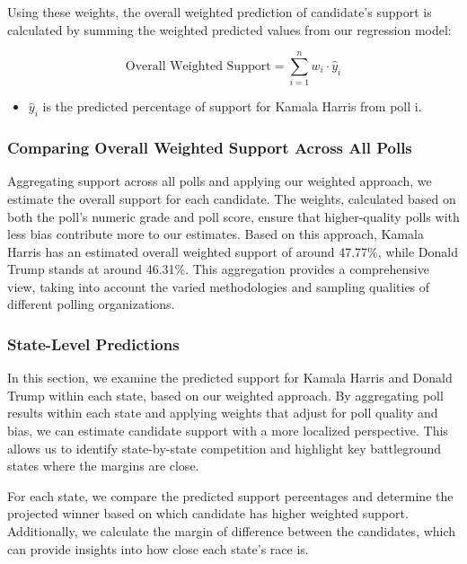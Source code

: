 \documentclass[
  letterpaper,
  DIV=11,
  numbers=noendperiod]{scrartcl}
\providecommand{\tightlist}{%
  \setlength{\itemsep}{0pt}\setlength{\parskip}{0pt}}\usepackage{longtable,booktabs,array}
\begin{document}
Using these weights, the overall weighted prediction of candidate's
support is calculated by summing the weighted predicted values from our
regression model:

\[
\text{Overall Weighted Support} = \sum_{i=1}^{n} w_i \cdot \hat{y}_i
\]

\begin{itemize}
\tightlist
\item
  \(\hat{y}_i\)\hspace{0pt} is the predicted percentage of support for
  Kamala Harris from poll i.
\end{itemize}

\hypertarget{comparing-overall-weighted-support-across-all-polls}{%
\subsubsection{Comparing Overall Weighted Support Across All
Polls}\label{comparing-overall-weighted-support-across-all-polls}}

Aggregating support across all polls and applying our weighted approach,
we estimate the overall support for each candidate. The weights,
calculated based on both the poll's numeric grade and poll score, ensure
that higher-quality polls with less bias contribute more to our
estimates. Based on this approach, Kamala Harris has an estimated
overall weighted support of around 47.77\%, while Donald Trump stands at
around 46.31\%. This aggregation provides a comprehensive view, taking
into account the varied methodologies and sampling qualities of
different polling organizations.

\hypertarget{state-level-predictions}{%
\subsubsection{State-Level Predictions}\label{state-level-predictions}}

In this section, we examine the predicted support for Kamala Harris and
Donald Trump within each state, based on our weighted approach. By
aggregating poll results within each state and applying weights that
adjust for poll quality and bias, we can estimate candidate support with
a more localized perspective. This allows us to identify state-by-state
competition and highlight key battleground states where the margins are
close.

For each state, we compare the predicted support percentages and
determine the projected winner based on which candidate has higher
weighted support. Additionally, we calculate the margin of difference
between the candidates, which can provide insights into how close each
state's race is.
\end{document}
